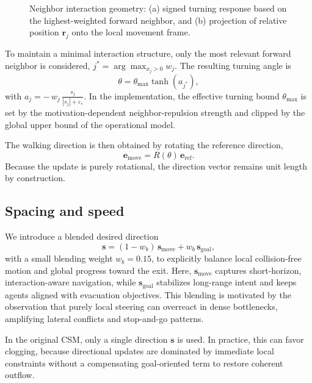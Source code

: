 \documentclass[pdflatex,sn-mathphys-num]{sn-jnl}%
\theoremstyle{thmstyleone}%
\theoremstyle{thmstyletwo}%
\theoremstyle{thmstylethree}%
\begin{document}
\begin{appendices}
\begin{figure}[htbp]
    \caption{Neighbor interaction geometry: (a) signed turning response based on the highest-weighted forward neighbor, and (b) projection of relative position $\mathbf{r}_j$ onto the local movement frame.}
    \label{fig:neighbor_geometry}
\end{figure}

To maintain a minimal interaction structure, only the most relevant
forward neighbor is considered, $j^* = \arg\max_{x_j>0} w_j$. The
resulting turning angle is
\begin{equation}
\theta = \theta_{\max}\tanh(a_{j^*}),
\label{eq:theta}
\end{equation}
with $a_j = -\, w_j \, \frac{s_j}{|s_j|+\varepsilon_s}$.
In the implementation, the effective turning bound $\theta_{\max}$ is set
by the motivation-dependent neighbor-repulsion strength and clipped by the
global upper bound of the operational model.

The walking direction is then obtained by rotating the reference
direction,
\begin{equation}
\mathbf{e}_{\mathrm{move}} = R(\theta)\,\mathbf{e}_{\mathrm{ref}}.
\label{eq:rotation}
\end{equation}
Because the update is purely rotational, the direction vector remains unit
length by construction.

\subsection{Spacing and speed}

We introduce a blended desired direction
\begin{equation}
\mathbf{s}=(1-w_b)\,\mathbf{s}_{\mathrm{move}}+w_b\,\mathbf{s}_{\mathrm{goal}},
\end{equation}
with a small blending weight $w_b=0.15$, to explicitly balance local
collision-free motion and global progress toward the exit. Here,
\(\mathbf{s}_{\mathrm{move}}\) captures short-horizon, interaction-aware
navigation, while \(\mathbf{s}_{\mathrm{goal}}\) stabilizes long-range
intent and keeps agents aligned with evacuation objectives. This blending
is motivated by the observation that purely local steering can overreact
in dense bottlenecks, amplifying lateral conflicts and stop-and-go
patterns.

In the original CSM, only a single direction \(\mathbf{s}\) is used. In
practice, this can favor clogging, because directional updates are
dominated by immediate local constraints without a compensating
goal-oriented term to restore coherent outflow.


\end{appendices}
\end{document}
